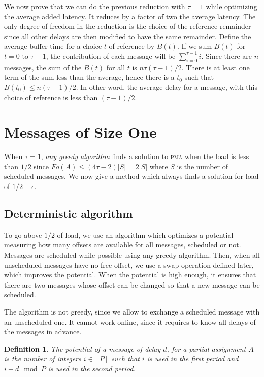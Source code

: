\documentclass[10pt, conference, letterpaper]{IEEEtran}
\newtheorem{definition}{Definition}
\newcommand\pma{\textsc{pma}\xspace}
\begin{document}
We now prove that we can do the previous reduction with $\tau=1$ while optimizing the average added latency. It reduces by a factor of two the average latency. The only degree of freedom in the reduction is the choice of the reference remainder since all other delays are then modified to have the same remainder.
Define the average buffer time for a choice $t$ of reference by $B(t)$. 
If we sum $B(t)$ for $t=0$ to $\tau-1$, the contribution of each message 
will be $\sum_{i=0}^{\tau-1} i$. Since there are $n$ messages, the sum of the $B(t)$ for all $t$ is $n \tau (\tau-1)/2$. There is at least one term of the sum less than the average,
hence there is a $t_0$ such that $B(t_0) \leq n (\tau-1)/2$. In other word, the average
delay for a message, with this choice of reference is less than $(\tau -1)/2$.


\section{Messages of Size One} \label{sec:small}

When $\tau = 1$, \emph{any greedy algorithm} finds a solution to \pma when the load is less than $1/2$ since $Fo(A) \leq (4\tau -2)|S| = 2|S|$ where $S$ is the number of scheduled messages. We now give a method which always finds a solution for load of $1/2 + \epsilon$.

\subsection{Deterministic algorithm}

To go above $1/2$ of load, we use an algorithm which optimizes a potential measuring how many offsets are available for all messages, scheduled or not. Messages are scheduled while possible using any greedy algorithm.
Then, when all unscheduled messages have no free offset, we use a swap operation defined later, which improves the potential. When the potential is high enough, it ensures that there are two messages whose offset can be changed so that a new message can be scheduled. 

 The algorithm is not greedy, since we allow to exchange a scheduled message with an unscheduled one. It cannot work online, since it requires to know all delays of the messages in advance. 

\begin{definition}
The potential of a message of delay $d$, for a partial assignment $A$
is the number of integers $i \in [P]$ such that $i$ is used in the first period and $i+d \mod P$ is used in the second period.
\end{definition}
\end{document}
